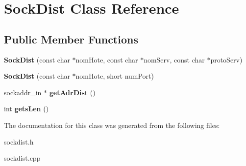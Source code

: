\hypertarget{class_sock_dist}{\section{\-Sock\-Dist \-Class \-Reference}
\label{class_sock_dist}
}
\subsection*{\-Public \-Member \-Functions}
\begin{DoxyCompactItemize}
\item 
\hypertarget{class_sock_dist_a55e2989019f9fc7bd0626de2a799e98d}{{\bfseries \-Sock\-Dist} (const char $\ast$nom\-Hote, const char $\ast$nom\-Serv, const char $\ast$proto\-Serv)}\label{class_sock_dist_a55e2989019f9fc7bd0626de2a799e98d}

\item 
\hypertarget{class_sock_dist_acbf1f7f8e666ba9f00010aa037f9bc37}{{\bfseries \-Sock\-Dist} (const char $\ast$nom\-Hote, short num\-Port)}\label{class_sock_dist_acbf1f7f8e666ba9f00010aa037f9bc37}

\item 
\hypertarget{class_sock_dist_a03dfa728b21bfd0ab228a5a671a81648}{sockaddr\-\_\-in $\ast$ {\bfseries get\-Adr\-Dist} ()}\label{class_sock_dist_a03dfa728b21bfd0ab228a5a671a81648}

\item 
\hypertarget{class_sock_dist_afa8bbad9517c5f1941cd890495b296cf}{int {\bfseries gets\-Len} ()}\label{class_sock_dist_afa8bbad9517c5f1941cd890495b296cf}

\end{DoxyCompactItemize}


\-The documentation for this class was generated from the following files\-:\begin{DoxyCompactItemize}
\item 
sockdist.\-h\item 
sockdist.\-cpp\end{DoxyCompactItemize}
